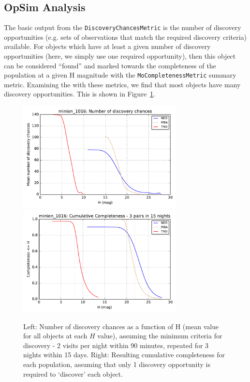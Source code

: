 \subsection{OpSim Analysis}
\label{sec:\secname:analysis}

The basic output from the {\tt DiscoveryChancesMetric} is the number
of discovery opportunities (e.g. sets of observations that match the
required discovery criteria) available. For objects which have at
least a given number of discovery opportunities (here, we simply use
one required opportunity), then this object can be considered
``found'' and marked towards the completeness of the population at a
given H magnitude with the {\tt MoCompletenessMetric} summary metric.
Examining the  with these metrics, we find
that most objects have many discovery opportunities. This is shown in
Figure~\ref{standard_discovery}.

\begin{figure}
\includegraphics[width=3.3in]{figs/solarsystem/minion_1016_DiscoveryChances_tno_mba_neo_10_year_3_pairs_in_15_nights_MOOB_ComboMetricVsH}
\includegraphics[width=3.3in]{figs/solarsystem/minion_1016_CumulativeCompleteness_tno_mba_neo_10_year_3_pairs_in_15_nights_MOOB_ComboMetricVsH}
\caption{Left: Number of discovery chances as a function of H
  (mean value for all objects at each $H$ value), assuming the minimum criteria for
  discovery - 2 visits per night within 90 minutes, repeated for 3
  nights within 15 days. Right: Resulting cumulative completeness for
  each population, assuming that only 1 discovery opportunity is
  required to `discover' each object.
\label{standard_discovery}}
\end{figure}

